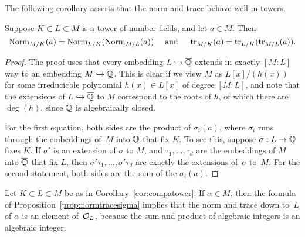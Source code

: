 The following corollary asserts that the norm and trace behave well in
towers.
\begin{corollary}
	\label{cor:compatower}
	Suppose $K\subset L \subset M$ is a tower of number fields, and
	let $a\in M$.  Then
	$$
		\operatorname{Norm}_{M/K}(a) = \operatorname{Norm}_{L/K}(\operatorname{Norm}_{M/L}(a))
		\quad\text{ and }\quad
		\operatorname{tr}_{M/K}(a) = \operatorname{tr}_{L/K}(\operatorname{tr}_{M/L}(a)).
	$$
\end{corollary}
\begin{proof}
	The proof uses that every embedding $L\hookrightarrow \overline{\mathbb{Q}}$ extends in exactly
	$[M:L]$ way to an embedding $M\hookrightarrow \overline{\mathbb{Q}}$.  This is clear
	if we view $M$ as $L[x]/(h(x))$ for some irreducicble
	polynomial $h(x) \in L[x]$ of degree $[M:L]$, and note that
	the extensions of $L\hookrightarrow \overline{\mathbb{Q}}$ to $M$ correspond to
	the roots of $h$, of which there are $\deg(h)$, since $\overline{\mathbb{Q}}$
	is algebraically closed.
	
	For the first equation, both sides are the product of $\sigma_i(a)$,
	where $\sigma_i$ runs through the embeddings of~$M$ into $\overline{\mathbb{Q}}$
	that fix $K$.  To see this, suppose $\sigma:L\to \overline{\mathbb{Q}}$ fixes $K$.
	If $\sigma'$ is an extension of $\sigma$ to $M$, and $\tau_1,\ldots,
	\tau_d$ are the embeddings of $M$ into $\overline{\mathbb{Q}}$ that fix $L$, then
	$\sigma'\tau_1,\ldots,\sigma'\tau_d$ are exactly the extensions
	of~$\sigma$ to~$M$.  For the second statement, both sides are the
	sum of the $\sigma_i(a)$.
\end{proof}

Let $K\subset L\subset M$ be as in Corollary~\ref{cor:compatower}.  If
$\alpha\in M$, then the formula of
Proposition~\ref{prop:normtracesigma} implies that the norm and trace
down to~$L$ of $\alpha$ is an element of~$\mathcal{O}_L$, because the sum and
product of algebraic integers is an algebraic integer.

